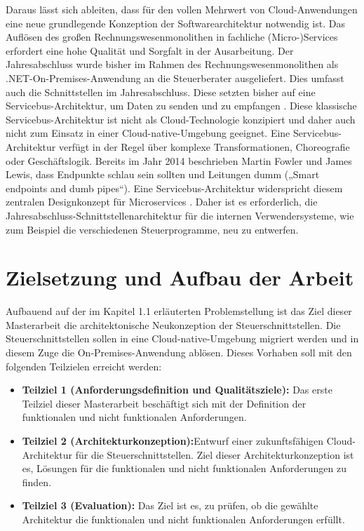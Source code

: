 Daraus lässt sich ableiten, dass für den vollen Mehrwert von Cloud-Anwendungen eine neue grundlegende Konzeption der Softwarearchitektur notwendig ist. Das Auflösen des großen Rechnungswesenmonolithen in fachliche (Micro-)Services erfordert eine hohe Qualität und Sorgfalt in der Ausarbeitung. Der Jahresabschluss wurde bisher im Rahmen des Rechnungswesenmonolithen als .NET-On-Premises-Anwendung an die Steuerberater ausgeliefert. Dies umfasst auch die Schnittstellen im Jahresabschluss. Diese setzten bisher auf eine Servicebus-Architektur, um Daten zu senden und zu empfangen \cite{TFSServiceBusLegacyCode}. Diese klassische Servicebus-Architektur ist nicht als Cloud-Technologie konzipiert und daher auch nicht zum Einsatz in einer Cloud-native-Umgebung geeignet. Eine Servicebus-Architektur verfügt in der Regel über komplexe Transformationen, Choreografie oder Geschäftslogik. Bereits im Jahr 2014 beschrieben Martin Fowler und James Lewis, dass Endpunkte schlau sein sollten und Leitungen dumm („Smart endpoints and dumb pipes“). Eine Servicebus-Architektur widerspricht diesem zentralen Designkonzept für Microservices \cite{FowlerMicroservices2014}. Daher ist es erforderlich, die Jahresabschluss-Schnittstellenarchitektur für die internen Verwendersysteme, wie zum Beispiel die verschiedenen Steuerprogramme, neu zu entwerfen.

\section{Zielsetzung und Aufbau der Arbeit}
Aufbauend auf der im Kapitel 1.1 erläuterten Problemstellung ist das Ziel dieser Masterarbeit die architektonische Neukonzeption der Steuerschnittstellen. Die Steuerschnittstellen sollen in eine Cloud-native-Umgebung migriert werden und in diesem Zuge die On-Premises-Anwendung ablösen. Dieses Vorhaben soll mit den folgenden Teilzielen erreicht werden:
\begin{itemize}
    \item \textbf{Teilziel 1 (Anforderungsdefinition und Qualitätsziele):} Das erste Teilziel dieser Masterarbeit beschäftigt sich mit der Definition der funktionalen und nicht funktionalen Anforderungen.
    \item \textbf{Teilziel 2 (Architekturkonzeption):}Entwurf einer zukunftsfähigen Cloud-Architektur für die Steuerschnittstellen. Ziel dieser Architekturkonzeption ist es, Lösungen für die funktionalen und nicht funktionalen Anforderungen zu finden.
    \item \textbf{Teilziel 3 (Evaluation):} Das Ziel ist es, zu prüfen, ob die gewählte Architektur die funktionalen und nicht funktionalen Anforderungen erfüllt.
\end{itemize}
